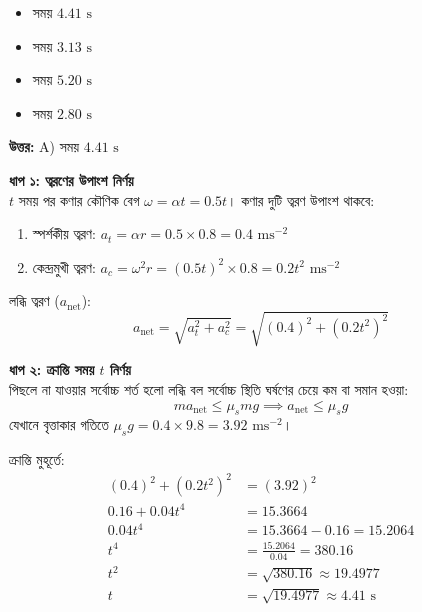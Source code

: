 \documentclass[12pt, a4paper]{article}
\begin{document}
{{%
\begin{itemize}[label={}, leftmargin=1cm, itemsep=0.5em]
    \item[\textbf{A)}] সময় $4.41\text{ s}$
    \item[\textbf{B)}] সময় $3.13\text{ s}$
    \item[\textbf{C)}] সময় $5.20\text{ s}$
    \item[\textbf{D)}] সময় $2.80\text{ s}$
\end{itemize}

\vspace{0.5em}
\begin{tcolorbox}[answerbox]
    \textbf{\color{success} উত্তর:} A) সময় $4.41\text{ s}$
\end{tcolorbox}
\vspace{1em}

\begin{tcolorbox}[solutionbox={সমাধান (Solution)}]
    \noindent
    \textbf{ধাপ ১: ত্বরণের উপাংশ নির্ণয়} \\
    $t$ সময় পর কণার কৌণিক বেগ $\omega = \alpha t = 0.5 t$। কণার দুটি ত্বরণ উপাংশ থাকবে:
    \begin{enumerate}[topsep=0pt, itemsep=2pt]
        \item স্পর্শকীয় ত্বরণ: $a_t = \alpha r = 0.5 \times 0.8 = 0.4\text{ ms}^{-2}$
        \item কেন্দ্রমুখী ত্বরণ: $a_c = \omega^2 r = (0.5 t)^2 \times 0.8 = 0.2 t^2\text{ ms}^{-2}$
    \end{enumerate}
    লব্ধি ত্বরণ ($a_{\text{net}}$):
    \[ a_{\text{net}} = \sqrt{a_t^2 + a_c^2} = \sqrt{(0.4)^2 + (0.2 t^2)^2} \]
    
    \vspace{0.5em}
    \noindent\textbf{ধাপ ২: ক্রান্তি সময় $t$ নির্ণয়} \\
    পিছলে না যাওয়ার সর্বোচ্চ শর্ত হলো লব্ধি বল সর্বোচ্চ স্থিতি ঘর্ষণের চেয়ে কম বা সমান হওয়া:
    \[ m a_{\text{net}} \le \mu_s m g \implies a_{\text{net}} \le \mu_s g \]
    যেখানে বৃত্তাকার গতিতে $\mu_s g = 0.4 \times 9.8 = 3.92\text{ ms}^{-2}$।
    
    ক্রান্তি মুহূর্তে:
    \begin{align*}
        (0.4)^2 + (0.2 t^2)^2 &= (3.92)^2 \\
        0.16 + 0.04 t^4 &= 15.3664 \\
        0.04 t^4 &= 15.3664 - 0.16 = 15.2064 \\
        t^4 &= \frac{15.2064}{0.04} = 380.16 \\
        t^2 &= \sqrt{380.16} \approx 19.4977 \\
        t &= \sqrt{19.4977} \approx \mathbf{4.41}\text{ s}
    \end{align*}
\end{tcolorbox}

}}
\end{document}
